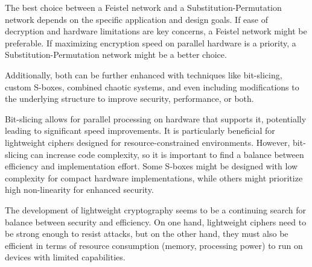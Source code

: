 \documentclass[conference]{IEEEtran}
\begin{document}
The best choice between a Feistel network and a Substitution-Permutation network depends on the specific application and design goals. If ease of decryption and hardware limitations are key concerns, a Feistel network might be preferable. If maximizing encryption speed on parallel hardware is a priority, a Substitution-Permutation network might be a better choice.

Additionally, both can be further enhanced with techniques like bit-slicing, custom S-boxes, combined chaotic systems, and even including modifications to the underlying structure to improve security, performance, or both.

Bit-slicing allows for parallel processing on hardware that supports it, potentially leading to significant speed improvements. It is particularly beneficial for lightweight ciphers designed for resource-constrained environments. However, bit-slicing can increase code complexity, so it is important to find a balance between efficiency and implementation effort. Some S-boxes might be designed with low complexity for compact hardware implementations, while others might prioritize high non-linearity for enhanced security.

The development of lightweight cryptography seems to be a continuing search for balance between security and efficiency. On one hand, lightweight ciphers need to be strong enough to resist attacks, but on the other hand, they must also be efficient in terms of resource consumption (memory, processing power) to run on devices with limited capabilities.




\vspace{12pt}
\end{document}
